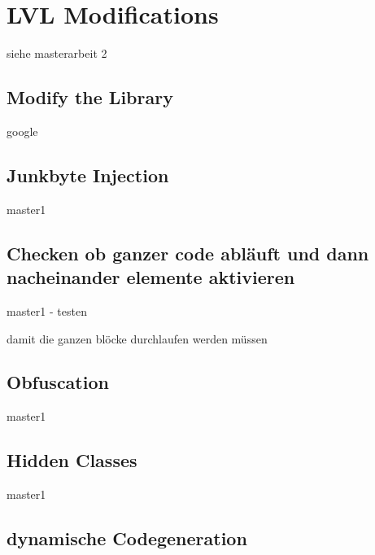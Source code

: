\section{LVL Modifications}\label{section:lvlModifications}
siehe masterarbeit 2

\subsection{Modify the Library}\label{subsection:basic-}
google

\subsection{Junkbyte Injection}\label{subsection:basic-junkbyte}
master1

\subsection{Checken ob ganzer code abläuft und dann nacheinander elemente aktivieren}\label{subsection:basic-flow}
master1 - testen\newline

damit die ganzen blöcke durchlaufen werden müssen


\subsection{Obfuscation}\label{subsection:basic-obfuscation}
master1

\subsection{Hidden Classes}\label{subsection:basic-hidden}
master1

\subsection{dynamische Codegeneration}\label{subsection:advanced-secure}
